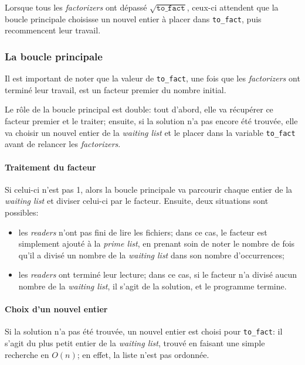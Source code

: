 \documentclass[a4paper,10pt]{article}
\begin{document}
Lorsque tous les \emph{factorizers} ont dépassé $\sqrt{\texttt{to\_fact}}$, ceux-ci attendent que la boucle principale choisisse un nouvel entier à placer dans \texttt{to\_fact}, puis recommencent leur travail.

\subsubsection*{La boucle principale}

Il est important de noter que la valeur de \texttt{to\_fact}, une fois que les \emph{factorizers} ont terminé leur travail, est un facteur premier du nombre initial. %

Le rôle de la boucle principal est double: tout d'abord, elle va récupérer ce facteur premier et le traiter; ensuite, si la solution n'a pas encore été trouvée, elle va choisir un nouvel entier de la \emph{waiting list} et le placer dans la variable \texttt{to\_fact} avant de relancer les \emph{factorizers}.

\paragraph{Traitement du facteur}
Si celui-ci n'est pas 1, alors la boucle principale va parcourir chaque entier de la \emph{waiting list} et diviser celui-ci par le facteur. Ensuite, deux situations sont possibles:
\begin{itemize}
    \item les \emph{readers} n'ont pas fini de lire les fichiers; dans ce cas, le facteur est simplement ajouté à la \emph{prime list}, en prenant soin de noter le nombre de fois qu'il a divisé un nombre de la \emph{waiting list} dans son nombre d'occurrences;
    \item les \emph{readers} ont terminé leur lecture; dans ce cas, si le facteur n'a divisé aucun nombre de la \emph{waiting list}, il s'agit de la solution, et le programme termine.
\end{itemize}

\paragraph{Choix d'un nouvel entier}
Si la solution n'a pas été trouvée, un nouvel entier est choisi pour \texttt{to\_fact}: il s'agit du plus petit entier de la \emph{waiting list}, trouvé en faisant une simple recherche en $O(n)$; en effet, la liste n'est pas ordonnée.
\end{document}
